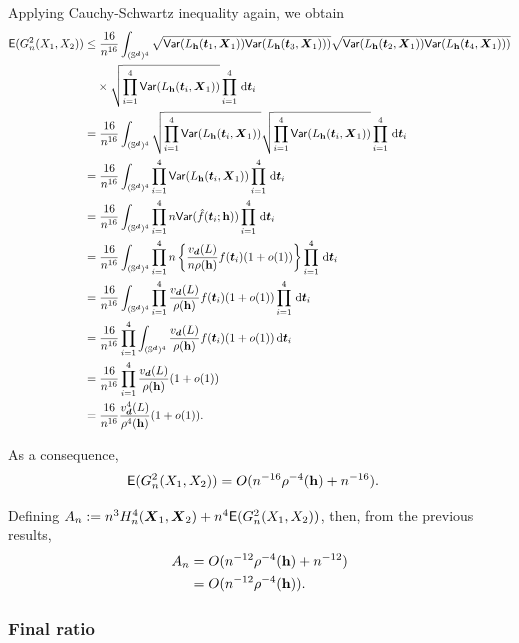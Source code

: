 \documentclass{article}
\begin{document}
Applying Cauchy-Schwartz inequality again, we obtain
\begin{align*}
    \mathsf{E} (G_n^2(X_1,X_2)) \le &\; \frac{16}{n^{16}} \int_{(\mathbb{S}^{\boldsymbol{d}})^4}  \sqrt{\mathsf{Var} ({L}_{\mathbf h} (\boldsymbol{t}_1,\boldsymbol{X}_1)) \mathsf{Var} ({L}_{\mathbf h} (\boldsymbol{t}_3,\boldsymbol{X}_1)))} \sqrt{\mathsf{Var} ({L}_{\mathbf h} (\boldsymbol{t}_2,\boldsymbol{X}_1)) \mathsf{Var} ({L}_{\mathbf h} (\boldsymbol{t}_4,\boldsymbol{X}_1)))} \\
    & \times \sqrt{\prod_{i=1}^{4} \mathsf{Var} ({L}_{\mathbf h} (\boldsymbol{t}_i,\boldsymbol{X}_1)) } \prod_{i=1}^{4} \,\mathrm{d} \boldsymbol{t}_i \\
    =&\; \frac{16}{n^{16}} \int_{(\mathbb{S}^{\boldsymbol{d}})^4} \sqrt{\prod_{i=1}^{4} \mathsf{Var} ({L}_{\mathbf h} (\boldsymbol{t}_i,\boldsymbol{X}_1)) } \sqrt{\prod_{i=1}^{4} \mathsf{Var} ({L}_{\mathbf h} (\boldsymbol{t}_i,\boldsymbol{X}_1)) } \prod_{i=1}^{4} \,\mathrm{d} \boldsymbol{t}_i \\
    =&\; \frac{16}{n^{16}} \int_{(\mathbb{S}^{\boldsymbol{d}})^4} \prod_{i=1}^{4} \mathsf{Var} ({L}_{\mathbf h} (\boldsymbol{t}_i,\boldsymbol{X}_1)) \prod_{i=1}^{4} \,\mathrm{d} \boldsymbol{t}_i \\
    =&\; \frac{16}{n^{16}} \int_{(\mathbb{S}^{\boldsymbol{d}})^4} \prod_{i=1}^{4} n \mathsf{Var} (\hat{f}(\boldsymbol{t}_i;\mathbf h)) \prod_{i=1}^{4} \,\mathrm{d} \boldsymbol{t}_i \\
    =&\; \frac{16}{n^{16}} \int_{(\mathbb{S}^{\boldsymbol{d}})^4} \prod_{i=1}^{4} n \left\{\frac{v_{\boldsymbol{d}}(L)}{n \rho(\mathbf h)} f(\boldsymbol{t}_i)(1 + o(1))\right\} \prod_{i=1}^{4} \,\mathrm{d} \boldsymbol{t}_i \\
    =&\; \frac{16}{n^{16}} \int_{(\mathbb{S}^{\boldsymbol{d}})^4} \prod_{i=1}^{4} \frac{v_{\boldsymbol{d}}(L)}{ \rho(\mathbf h)} f(\boldsymbol{t}_i)(1 + o(1)) \prod_{i=1}^{4} \,\mathrm{d} \boldsymbol{t}_i \\
    =&\; \frac{16}{n^{16}} \prod_{i=1}^{4} \int_{(\mathbb{S}^{\boldsymbol{d}})^4} \frac{v_{\boldsymbol{d}}(L)}{ \rho(\mathbf h)} f(\boldsymbol{t}_i)(1 + o(1)) \,\mathrm{d} \boldsymbol{t}_i \\
    =&\; \frac{16}{n^{16}} \prod_{i=1}^{4} \frac{v_{\boldsymbol{d}}(L)}{ \rho(\mathbf h)} (1 + o(1)) \\
    =&\; \frac{16}{n^{16}} \frac{v_{\boldsymbol{d}}^4(L)}{ \rho^4(\mathbf h)} (1 + o(1)).
\end{align*}

As a consequence,
\begin{align*}
    \mathsf{E} (G_n^2(X_1,X_2)) &= O(n^{-16} \rho^{-4}(\mathbf h) + n^{-16}).
\end{align*}

Defining $A_n := n^3 H_n^4(\boldsymbol{X}_1, \boldsymbol{X}_2) + n^4 \mathsf{E} (G_n^2(X_1,X_2))$, then, from the previous results,
\begin{align*}
    A_n &= O(n^{-12} \rho^{-4}(\mathbf h) + n^{-12}) \\
    &= O(n^{-12} \rho^{-4}(\mathbf h)).
\end{align*}

\subsubsection{Final ratio}
\end{document}
